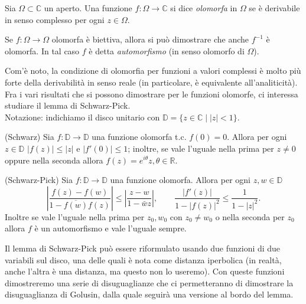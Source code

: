 \begin{defn}
  Sia $\Omega \subset \mathbb{C}$ un aperto. Una funzione $f:\Omega \longrightarrow \mathbb{C}$ si dice \textit{olomorfa} in $\Omega$ se è derivabile in senso complesso per ogni $z \in \Omega$.
\end{defn}

\begin{defn}
  Se $f: \Omega \longrightarrow \Omega$ olomorfa è biettiva, allora si può dimostrare che anche $f^{-1}$ è olomorfa. In tal caso $f$ è detta \textit{automorfismo} (in senso olomorfo di $\Omega$).
\end{defn}

Com'è noto, la condizione di olomorfia per funzioni a valori complessi è molto più forte della derivabilità in senso reale (in particolare, è equivalente all'analiticità). Fra i vari risultati che si possono dimostrare per le funzioni olomorfe, ci interessa studiare il lemma di Schwarz-Pick. \\

Notazione: indichiamo il disco unitario con $\mathbb{D}=\{z \in \mathbb{C} \mid |z|<1\}$.

\begin{lm}
  (Schwarz) Sia $f:\mathbb{D} \longrightarrow \mathbb{D}$ una funzione olomorfa t.c. $f(0)=0$. Allora per ogni $z \in \mathbb{D}$ $|f(z)| \le |z|$ e $|f'(0)| \le 1$; inoltre, se vale l'uguale nella prima per $z \not=0$ oppure nella seconda allora $f(z)=e^{i\theta}z, \theta \in \mathbb{R}$.
\end{lm}

\begin{lm}
  (Schwarz-Pick) Sia $f:\mathbb{D} \longrightarrow \mathbb{D}$ una funzione olomorfa.
  Allora per ogni $z, w \in \mathbb{D}$
  $$\left|\frac{f(z)-f(w)}{1-\overline{f(w)}f(z)}\right| \le \left|\frac{z-w}{1-\bar{w}z}\right|, \qquad \frac{|f'(z)|}{1-|f(z)|^2} \le \frac{1}{1-|z|^2}.$$
  Inoltre se vale l'uguale nella prima per $z_0, w_0$ con $z_0 \not=w_0$ o nella seconda per $z_0$ allora $f$ è un automorfismo e vale l'uguale sempre.
\end{lm}

Il lemma di Schwarz-Pick può essere riformulato usando due funzioni di due variabili sul disco, una delle quali è nota come distanza iperbolica (in realtà, anche l'altra è una distanza, ma questo non lo useremo). Con queste funzioni dimostreremo una serie di disuguaglianze che ci permetteranno di dimostrare la disuguaglianza di Golusin, dalla quale seguirà una versione al bordo del lemma.

